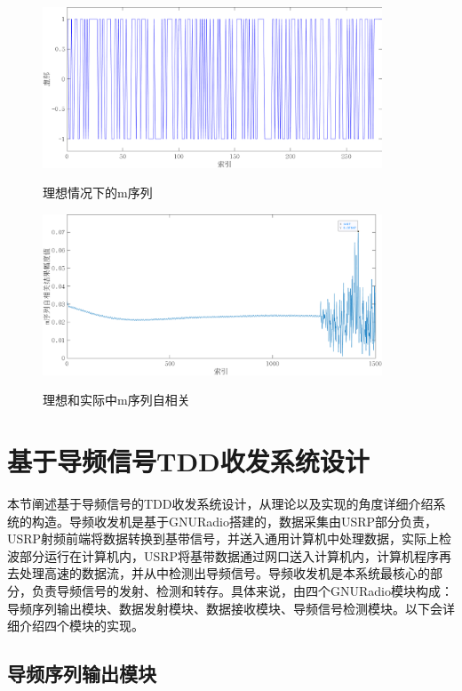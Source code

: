\documentclass[master]{seuthesis} %
\begin{document}
\begin{Main}
\begin{figure}
    \centering
    \includegraphics[width=0.9\textwidth]{images/m_seq}
    \caption{理想情况下的m序列}{} 
    \label{m_seq}
\end{figure}

\begin{figure}
    \centering
    \includegraphics[width=0.9\textwidth]{images/m_corr_practical}
    \caption{理想和实际中m序列自相关}{} %
    \label{m_corr_practical}
\end{figure}

\section{基于导频信号TDD收发系统设计}

本节阐述基于导频信号的TDD收发系统设计，从理论以及实现的角度详细介绍系统的构造。导频收发机是基于GNURadio搭建的，数据采集由USRP部分负责，USRP射频前端将数据转换到基带信号，并送入通用计算机中处理数据，实际上检波部分运行在计算机内，USRP将基带数据通过网口送入计算机内，计算机程序再去处理高速的数据流，并从中检测出导频信号。导频收发机是本系统最核心的部分，负责导频信号的发射、检测和转存。具体来说，由四个GNURadio模块构成：导频序列输出模块、数据发射模块、数据接收模块、导频信号检测模块。以下会详细介绍四个模块的实现。

\subsection{导频序列输出模块}


\end{Main}
\end{document}

